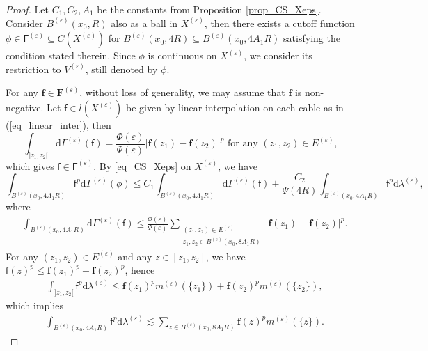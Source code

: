 \documentclass[11pt,a4paper]{article}
\numberwithin{equation}{section}
\theoremstyle{plain}
\theoremstyle{definition}
\begin{document}
\begin{proof}
Let $C_1,C_2,A_1$ be the constants from Proposition \ref{prop_CS_Xeps}. Consider $B^{(\varepsilon)}(x_0,R)$ also as a ball in $X^{(\varepsilon)}$, then there exists a cutoff function $\phi\in\mathsf{F}^{(\varepsilon)}\subseteq C(X^{(\varepsilon)})$ for $B^{(\varepsilon)}(x_0,4R)\subseteq B^{(\varepsilon)}(x_0,4A_1R)$ satisfying the condition stated therein. Since $\phi$ is continuous on $X^{(\varepsilon)}$, we consider its restriction to $V^{(\varepsilon)}$, still denoted by $\phi$.

For any $\mathbf{f}\in\mathbf{F}^{(\varepsilon)}$, without loss of generality, we may assume that $\mathbf{f}$ is non-negative. Let $\mathsf{f}\in l(X^{(\varepsilon)})$  be given by linear interpolation on each cable as in (\ref{eq_linear_inter}), then
$$\int_{]z_1,z_2[}\mathrm{d}\Gamma^{(\varepsilon)}(\mathsf{f})=\frac{\Phi(\varepsilon)}{\Psi(\varepsilon)}\lvert\mathbf{f}(z_1)-\mathbf{f}(z_2)\rvert^p\text{ for any }(z_1,z_2)\in E^{(\varepsilon)},$$
which gives $\mathsf{f}\in \mathsf{F}^{(\varepsilon)}$. By \ref{eq_CS_Xeps} on $X^{(\varepsilon)}$, we have
\begin{equation}\label{eq_CS_VepsA}
\int_{B^{(\varepsilon)}(x_0,4A_1R)}\mathsf{f}^p\mathrm{d}\Gamma^{(\varepsilon)}(\phi)\le C_{1}\int_{B^{(\varepsilon)}(x_0,4A_1R)}\mathrm{d}\Gamma^{(\varepsilon)}(\mathsf{f})+\frac{C_{2}}{\Psi(4R)}\int_{B^{(\varepsilon)}(x_0,4A_1R)}\mathsf{f}^p\mathrm{d} \lambda^{(\varepsilon)},
\end{equation}
where
\begin{align}
&\int_{B^{(\varepsilon)}(x_0,4A_1R)}\mathrm{d}\Gamma^{(\varepsilon)}(\mathsf{f})\le\frac{\Phi(\varepsilon)}{\Psi(\varepsilon)}\sum_{\substack{(z_1,z_2)\in E^{(\varepsilon)}\\z_1,z_2\in B^{(\varepsilon)}(x_0,8A_1R)}}|\mathbf{f}(z_1)-\mathbf{f}(z_2)|^p.\label{eq_CS_VepsB}
\end{align}
For any $(z_1,z_2)\in E^{(\varepsilon)}$ and any $z\in[z_1,z_2]$, we have $\mathsf{f}(z)^p\le\mathbf{f}(z_1)^p+\mathbf{f}(z_2)^p$, hence
\begin{align*}
&\int_{]z_1,z_2[}\mathsf{f}^p\mathrm{d}\lambda^{(\varepsilon)}\le\mathbf{f}(z_1)^pm^{(\varepsilon)}(\{z_1\})+\mathbf{f}(z_2)^pm^{(\varepsilon)}(\{z_2\}),
\end{align*}
which implies
\begin{align}
&\int_{B^{(\varepsilon)}(x_0,4A_1R)}\mathsf{f}^p\mathrm{d} \lambda^{(\varepsilon)}\lesssim\sum_{z\in B^{(\varepsilon)}(x_0,8A_1R)}\mathbf{f}(z)^pm^{(\varepsilon)}(\{z\})\label{eq_CS_VepsC}.

\end{align}
\end{proof}
\end{document}
